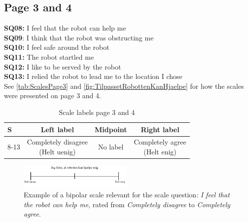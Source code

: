 \subsection{Page 3 and 4}
\noindent
\textbf{SQ08:} I feel that the robot can help me\\%
\textbf{SQ09}: I think that the robot was obstructing me\\%
\textbf{SQ10:} I feel safe around the robot\\%
\textbf{SQ11:} The robot startled me\\ %
\textbf{SQ12:} I like to be served by the robot\\%
\textbf{SQ13:} I relied the robot to lead me to the location I chose\\%
See \autoref{tab:ScalesPage3} and  \autoref{fig:TilpassetRobottenKanHjaelpe} for how the scales were presented on page 3 and 4.
\begin{table}[H]
	\centering
\caption{Scale labels page 3 and 4}
	\label{tab:ScalesPage3} 
	\begin{tabular}{l|c|c|c}
		S     & Left label & Midpoint & Right label \\\hline
		8-13   & \makecell{Completely disagree\\(Helt uenig)}  & No label & \makecell{Completely agree\\(Helt enig)}                      
	\end{tabular}        
\end{table}
\noindent
%
\begin{figure}[H]
\centering
\includegraphics[width = 0.49\textwidth]{Figure/TilpassetRobottenKanHjaelpe}
\setlength{} 
\caption{Example of a bipolar scale relevant for the scale question: \textit{I feel that the robot can help me}, rated from \textit{Completely disagree} to \textit{Completely agree}.}
\label{fig:TilpassetRobottenKanHjaelpe}
\end{figure}
\noindent
% 
